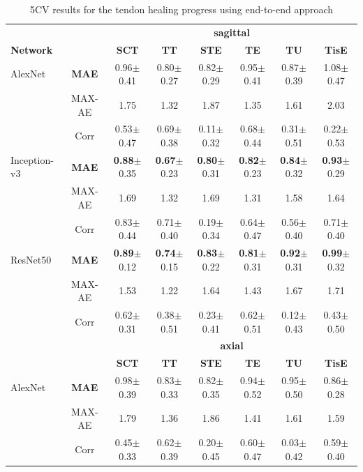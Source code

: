 \begin{table}[h]
	\scriptsize
	\setlength{\tabcolsep}{3pt}
	\centering
	\caption{5CV results for the tendon healing progress using end-to-end approach}
	\label{tab:usg_train_cross-validation}
	\begin{tabular}{lc||c|c|c|c|c|c}
		& & \multicolumn{6}{c}{\footnotesize{\textbf{sagittal}}} \\
		\textbf{Network} & & \textbf{SCT} & \textbf{TT} & \textbf{STE} & \textbf{TE} & \textbf{TU} & \textbf{TisE} \\ \hline
		AlexNet & \textbf{MAE} & 0.96$\pm$0.41 & 0.80$\pm$0.27 & 0.82$\pm$0.29 & 0.95$\pm$0.41 & 0.87$\pm$0.39 & 1.08$\pm$0.47  \\
		& MAX-AE & 1.75 & 1.32 & 1.87 & 1.35 & 1.61 & 2.03 \\ 
		& Corr & 0.53$\pm${0.47} & 0.69$\pm${0.38} & 0.11$\pm${0.32} & 0.68$\pm${0.44} & 0.31$\pm${0.51} & 0.22$\pm${0.53} \\ \hline
		Inception-v3 & \textbf{MAE} & \textbf{0.88}$\pm$0.35 & \textbf{0.67}$\pm$0.23 & \textbf{0.80}$\pm$0.31 & \textbf{0.82}$\pm$0.23 & \textbf{0.84}$\pm$0.32 & \textbf{0.93}$\pm$0.29  \\
		& MAX-AE & 1.69 & 1.32 & 1.69 & 1.31 & 1.58 & 1.64 \\ 
		& Corr & 0.83$\pm${0.44} & 0.71$\pm${0.40} & 0.19$\pm${0.34} & 0.64$\pm${0.47} & 0.56$\pm${0.40} & 0.71$\pm${0.40} \\ \hline
		ResNet50 & \textbf{MAE} & \textbf{0.89}$\pm$0.12 & \textbf{0.74}$\pm$0.15 & \textbf{0.83}$\pm$0.22 & \textbf{0.81}$\pm$0.31 & \textbf{0.92}$\pm$0.31 & \textbf{0.99}$\pm$0.32 \\
		& MAX-AE & 1.53 & 1.22 & 1.64 & 1.43 & 1.67 & 1.71 \\
		& Corr & 0.62$\pm${0.31} & 0.38$\pm${0.51} & 0.23$\pm${0.41} & 0.62$\pm${0.51} & 0.12$\pm${0.43} & 0.43$\pm${0.50} \\ \hline \hline
		& & \multicolumn{6}{c}{\footnotesize{\textbf{axial}}} \\
		& & \textbf{SCT} & \textbf{TT} & \textbf{STE} & \textbf{TE} & \textbf{TU} & \textbf{TisE}\\ \hline
		AlexNet & \textbf{MAE} & 0.98$\pm$0.39 & 0.83$\pm$0.33 & 0.82$\pm$0.35 & 0.94$\pm$0.52 & 0.95$\pm$0.50 & 0.86$\pm$0.28  \\
		& MAX-AE & 1.79 & 1.36 & 1.86 & 1.41 & 1.61 & 1.59 \\ 
		& Corr & 0.45$\pm${0.33} & 0.62$\pm${0.39} & 0.20$\pm${0.45} & 0.60$\pm${0.47} & 0.03$\pm${0.42} & 0.59$\pm${0.40} \\ \hline

\end{tabular}
\end{table}
